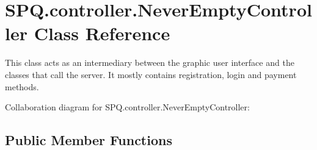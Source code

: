 \hypertarget{class_s_p_q_1_1controller_1_1_never_empty_controller}{}\section{S\+P\+Q.\+controller.\+Never\+Empty\+Controller Class Reference}
\label{class_s_p_q_1_1controller_1_1_never_empty_controller}


This class acts as an intermediary between the graphic user interface and the classes that call the server. It mostly contains registration, login and payment methods.  




Collaboration diagram for S\+P\+Q.\+controller.\+Never\+Empty\+Controller\+:
\subsection*{Public Member Functions}
